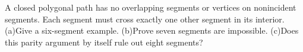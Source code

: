 A closed polygonal path has no overlapping segments or vertices on nonincident segments. Each segment must cross exactly one other segment in its interior. (a)Give a six-segment example. (b)Prove seven segments are impossible. (c)Does this parity argument by itself rule out eight segments?
